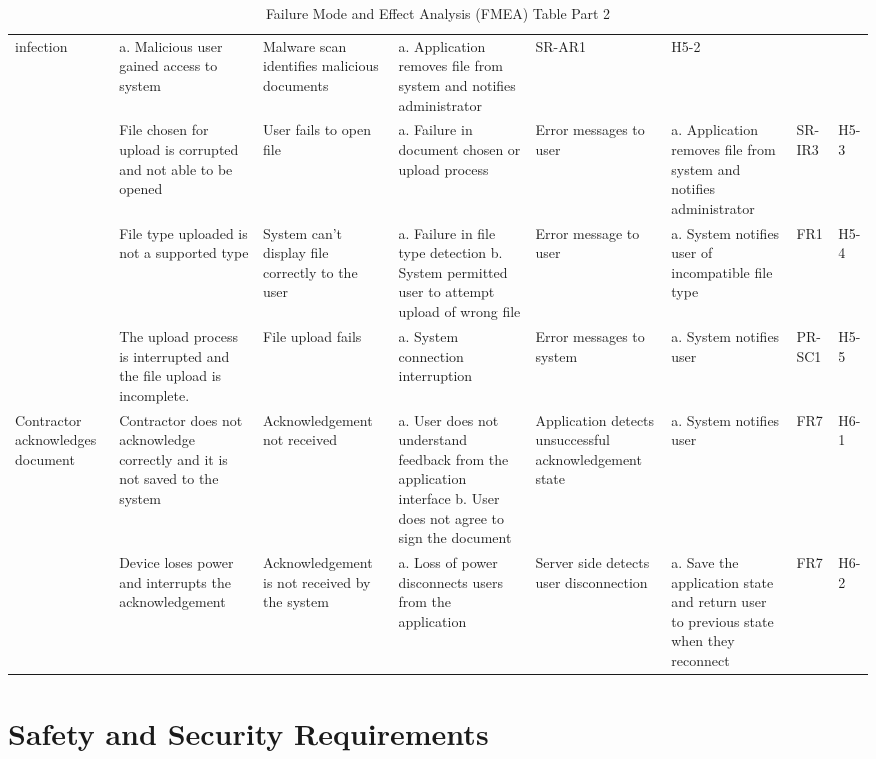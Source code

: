 \documentclass{article}
\begin{document}
\begin{table}[H]
{\begin{tabular}{|>{\raggedright}p{2.0cm}|>{\raggedright}p{2.0cm}|>{\raggedright}p{2.6cm}|>{\raggedright}p{4cm}|>{\raggedright}p{3cm}|>{\raggedright}p{4cm}|>{\raggedright}p{1.5cm}|p{1.5cm}|}
      infection &a. Malicious user gained access to system & Malware
      scan identifies malicious documents
      & a. Application removes file from system and notifies
      administrator & SR-AR1
      & H5-2 \\
      \cline{2-8}
      & File chosen for upload is corrupted and not able to be opened &
      User fails to open file &a. Failure in document chosen or upload process&
      Error messages to user& a. Application removes file from system and
      notifies administrator & SR-IR3 & H5-3 \\
      \cline{2-8}
      & File type uploaded is not a supported type & System can't display
      file correctly to the user & a. Failure in file type detection
      \newline b. System permitted user to attempt upload of wrong file &
      Error message to user& a. System notifies user of incompatible file type &
      FR1 & H5-4 \\
      \cline{2-8}
      & The upload process is interrupted and the file upload is incomplete. &
      File upload fails & a. System connection interruption &
      Error messages to system& a. System notifies user & PR-SC1 & H5-5\\
      \hline
      Contractor acknowledges document & Contractor does not acknowledge
      correctly and it is not saved to the system & Acknowledgement not received
      & a. User does not understand feedback from the application interface
      \newline b. User does not agree to sign the document & Application detects
      unsuccessful acknowledgement state & a. System notifies user &
      FR7 & H6-1 \\
      \cline{2-8}
      & Device loses power and interrupts the acknowledgement & Acknowledgement
      is not received by the system &
      a. Loss of power disconnects users from the application & Server side
      detects user disconnection & a. Save the application state and return
      user to previous state when they reconnect & FR7 & H6-2 \\
      \hline
    \end{tabular}
  }
  \caption{Failure Mode and Effect Analysis (FMEA) Table Part 2}
\end{table}

\section{Safety and Security Requirements}
\end{document}
